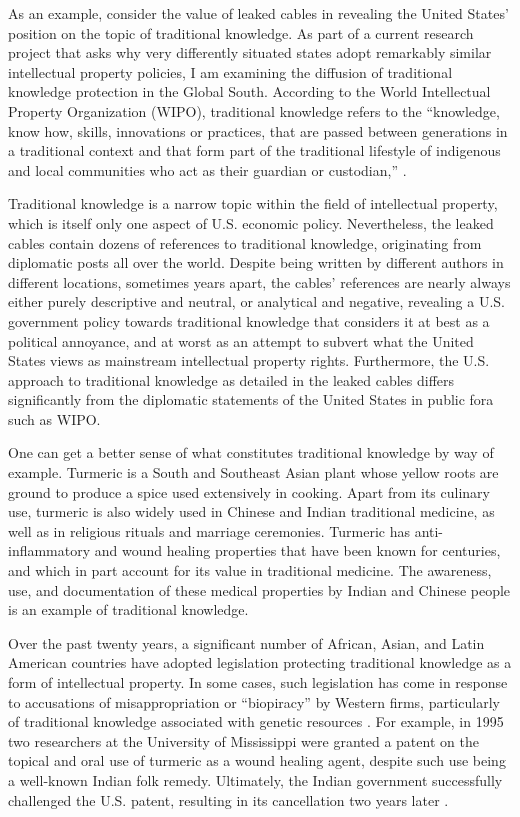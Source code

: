 \documentclass[12pt]{article}
\begin{document}
As an example, consider the value of leaked cables in revealing the United States' 
position on the topic of traditional knowledge. As part of a current research project that asks why 
very differently situated states 
adopt remarkably similar intellectual property policies, I am examining the diffusion of traditional 
knowledge protection in the Global South. According to the World Intellectual Property Organization 
(WIPO), traditional knowledge refers to the ``knowledge, know how, 
skills, innovations or practices, that are passed between generations in a traditional context and 
that form part of the traditional lifestyle of indigenous and local communities who act as their 
guardian or custodian,'' \citep{world_intellectual_property_organization2013traditional}.

Traditional knowledge is a narrow topic within the field of intellectual property, which is itself 
only one aspect of U.S. economic policy. Nevertheless, the leaked cables contain dozens of references 
to traditional knowledge, originating from diplomatic posts all over the world. Despite being written 
by different authors in different locations, sometimes years apart, the cables' references are nearly 
always either purely descriptive and neutral, or analytical and negative, revealing a U.S. government 
policy towards traditional knowledge that considers it at best as a political annoyance, and at worst as 
an attempt to subvert what the United States views as mainstream intellectual property rights. Furthermore, the U.S. 
approach to traditional knowledge as detailed in the leaked cables differs significantly from the 
diplomatic statements of the United States in public fora such as WIPO.

One can get a better sense of what constitutes traditional knowledge by way of example. Turmeric is 
a South and Southeast Asian plant whose yellow roots are ground to produce a spice used extensively 
in cooking. Apart from its culinary use, turmeric is also widely used in Chinese and Indian 
traditional medicine, as well as in religious rituals and marriage ceremonies. Turmeric has 
anti-inflammatory and wound healing properties that have been known for centuries, and which in part 
account for its value in traditional medicine. The awareness, use, and documentation of these medical 
properties by Indian and Chinese people is an example of traditional knowledge.

Over the past twenty years, a significant number of African, Asian, and Latin American countries have 
adopted legislation protecting traditional knowledge as a form of intellectual property. In some cases, 
such legislation has come in response to accusations of misappropriation or ``biopiracy'' by Western 
firms, particularly of traditional knowledge associated with genetic 
resources \citep{dagne2012protection}. For example, in 1995 two researchers at the University of Mississippi 
were granted a patent on the topical and oral use of turmeric as a wound healing agent, despite such 
use being a well-known Indian folk remedy. Ultimately, the Indian government successfully challenged the 
U.S. patent, resulting in its cancellation two years later \citep{kumar1997india}.
\end{document}
